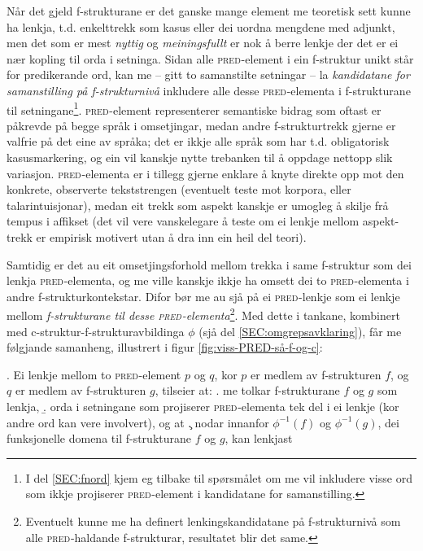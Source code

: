 \documentclass[12pt,a4paper,oneside,draft]{report}
\newcommand{\F}[2]{\textsc{#1}\ensuremath{_{#2}}}
\newcommand{\PRED}{\F{pred}{}}
\begin{document}
Når det gjeld f\hyp{}strukturane er det ganske mange element me
 teoretisk sett kunne ha lenkja, t.d. enkelttrekk som kasus eller dei
 uordna mengdene med adjunkt, men det som er mest \emph{nyttig} og
 \emph{meiningsfullt} er nok å berre lenkje der det er ei nær kopling til
 orda i setninga. Sidan alle \PRED{}-element i ein f\hyp{}struktur
 unikt står for predikerande ord, kan me -- gitt to samanstilte
 setningar -- la \emph{kandidatane for samanstilling på
 f\hyp{}strukturnivå} inkludere alle desse \PRED{}-elementa i
 f\hyp{}strukturane til setningane\footnote{I del \ref{SEC:fnord} kjem eg tilbake til spørsmålet om me vil
        inkludere visse ord som ikkje projiserer \PRED{}-element i
        kandidatane for samanstilling. }. \PRED{}-element
 representerer semantiske bidrag som oftast er påkrevde på begge språk
 i omsetjingar, medan andre f\hyp{}strukturtrekk gjerne er valfrie på
 det eine av språka; det er ikkje alle språk som har t.d. obligatorisk
 kasusmarkering, og ein vil kanskje nytte trebanken til å oppdage
 nettopp slik variasjon.  \PRED{}-elementa er i tillegg gjerne enklare
 å knyte direkte opp mot den konkrete, observerte tekststrengen
 (eventuelt teste mot korpora, eller talarintuisjonar), medan eit
 trekk som aspekt kanskje er umogleg å skilje frå tempus i affikset
 (det vil vere vanskelegare å teste om ei lenkje mellom aspekt-trekk
 er empirisk motivert utan å dra inn ein heil del teori).

Samtidig er det au eit omsetjingsforhold mellom trekka i same
f\hyp{}struktur som dei lenkja \PRED{}-elementa, og me ville kanskje ikkje ha
omsett dei to \PRED{}-elementa i andre f\hyp{}strukturkontekstar. Difor bør me
au sjå på ei \PRED{}-lenkje som ei lenkje mellom \emph{f\hyp{}strukturane til
desse \PRED{}-elementa}\footnote{Eventuelt kunne me ha definert lenkingskandidatane på
       f\hyp{}strukturnivå som alle \PRED{}-haldande f\hyp{}strukturar, resultatet
       blir det same. }.  Med dette i tankane, kombinert med
c\hyp{}struktur-f\hyp{}strukturavbildinga $\phi$ (sjå del
\ref{SEC:omgrepsavklaring}), får me følgjande samanheng, illustrert i
figur \ref{fig:viss-PRED-så-f-og-c}:

\ex. \label{krav:f-links} Ei lenkje mellom to \PRED{}-element $p$ og $q$, kor
      $p$ er medlem av f\hyp{}strukturen $f$, og $q$ er medlem av
      f\hyp{}strukturen $g$, tilseier at:
\a. \label{krav:f-links-substr} me tolkar f\hyp{}strukturane $f$ og $g$ som lenkja,
\b. \label{krav:f-links-words} orda i setningane som projiserer
     \PRED{}-elementa tek del i ei lenkje (kor andre
     ord kan vere involvert), og at
\c. \label{krav:f-links-domain} nodar innanfor $\phi^{-1}(f)$
     og $\phi^{-1}(g)$, dei funksjonelle domena til f\hyp{}strukturane $f$
     og $g$, kan lenkjast
\end{document}
